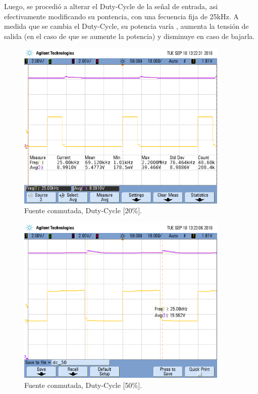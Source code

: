 Luego, se procedió a alterar el Duty-Cycle de la señal de entrada, asi efectivamente modificando su pontencia, con una fecuencia fija de 25kHz.
A medida que se cambia el Duty-Cycle, su potencia varía , aumenta la tensión de salida  (en el caso de que se aumente la potencia) y disminuye en caso de bajarla.
\begin{figure}[H]
	\centering
	\includegraphics[width=0.9\textwidth]{Imagenes/dc_20.png}
\caption{Fuente conmutada, Duty-Cycle [20\%].}
	\label{fig:fcon20}
\end{figure}
\begin{figure}[H]
	\centering
	\includegraphics[width=0.9\textwidth]{Imagenes/dc_50.png}
\caption{Fuente conmutada, Duty-Cycle [50\%].}
	\label{fig:fcon50}
\end{figure} 
